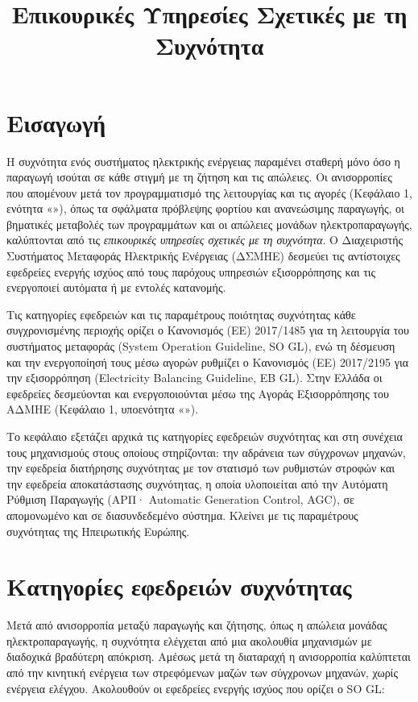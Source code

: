\title{Επικουρικές Υπηρεσίες Σχετικές με τη Συχνότητα}

\section{Εισαγωγή}
\label{kef-03-theoria}

Η συχνότητα ενός συστήματος ηλεκτρικής ενέργειας παραμένει σταθερή μόνο όσο η παραγωγή ισούται
σε κάθε στιγμή με τη ζήτηση και τις απώλειες. Οι ανισορροπίες που απομένουν μετά τον
προγραμματισμό της λειτουργίας και τις αγορές (Κεφάλαιο 1, ενότητα «»),
όπως τα σφάλματα πρόβλεψης φορτίου και ανανεώσιμης παραγωγής, οι βηματικές μεταβολές των
προγραμμάτων και οι απώλειες μονάδων ηλεκτροπαραγωγής, καλύπτονται από τις \emph{επικουρικές
υπηρεσίες σχετικές με τη συχνότητα}. Ο Διαχειριστής Συστήματος Μεταφοράς Ηλεκτρικής
Ενέργειας (ΔΣΜΗΕ) δεσμεύει τις
αντίστοιχες εφεδρείες ενεργής ισχύος από τους παρόχους υπηρεσιών εξισορρόπησης και τις
ενεργοποιεί αυτόματα ή με εντολές κατανομής.

Τις κατηγορίες εφεδρειών και τις παραμέτρους ποιότητας συχνότητας κάθε συγχρονισμένης περιοχής
ορίζει ο Κανονισμός (ΕΕ) 2017/1485 για τη λειτουργία του συστήματος μεταφοράς (System
Operation Guideline, SO GL), ενώ τη δέσμευση και την ενεργοποίησή τους μέσω αγορών ρυθμίζει ο
Κανονισμός (ΕΕ) 2017/2195 για την εξισορρόπηση (Electricity Balancing Guideline, EB GL). Στην
Ελλάδα οι εφεδρείες δεσμεύονται και ενεργοποιούνται μέσω της Αγοράς Εξισορρόπησης του ΑΔΜΗΕ
(Κεφάλαιο 1, υποενότητα «»).

Το κεφάλαιο εξετάζει αρχικά τις κατηγορίες εφεδρειών συχνότητας και στη συνέχεια τους
μηχανισμούς στους οποίους στηρίζονται: την αδράνεια των σύγχρονων μηχανών, την εφεδρεία
διατήρησης συχνότητας με τον στατισμό των ρυθμιστών στροφών και την εφεδρεία αποκατάστασης
συχνότητας, η οποία υλοποιείται από την Αυτόματη Ρύθμιση Παραγωγής (ΑΡΠ· Automatic Generation
Control, AGC), σε απομονωμένο και σε διασυνδεδεμένο σύστημα. Κλείνει με τις παραμέτρους
συχνότητας της Ηπειρωτικής Ευρώπης.

\section{Κατηγορίες εφεδρειών συχνότητας}
\label{sec:reserves}

Μετά από ανισορροπία μεταξύ παραγωγής και ζήτησης, όπως η απώλεια μονάδας ηλεκτροπαραγωγής, η
συχνότητα ελέγχεται από μια ακολουθία μηχανισμών με διαδοχικά βραδύτερη απόκριση. Αμέσως μετά
τη διαταραχή η ανισορροπία καλύπτεται από την κινητική ενέργεια των στρεφόμενων μαζών των
σύγχρονων μηχανών, χωρίς ενέργεια ελέγχου. Ακολουθούν οι εφεδρείες ενεργής ισχύος που ορίζει ο
SO GL:

